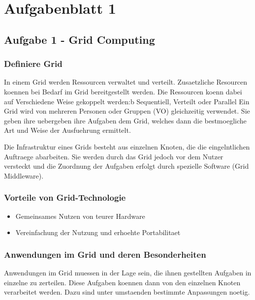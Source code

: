 \section{Aufgabenblatt 1}

\subsection{Aufgabe 1 - Grid Computing}

\subsubsection{Definiere Grid}
	In einem Grid werden Ressourcen verwaltet und verteilt.
	Zusaetzliche Resourcen koennen bei Bedarf im Grid bereitgestellt werden.
	Die Ressourcen koenn dabei auf Verschiedene Weise gekoppelt werden:b
	Sequentiell, Verteilt oder Parallel
	Ein Grid wird von mehreren Personen oder Gruppen (VO) gleichzeitig verwendet.
	Sie geben ihre uebergeben ihre Aufgaben dem Grid,
	welches dann die bestmoegliche Art und Weise der Ausfuehrung ermittelt.
	
	Die Infrastruktur eines Grids besteht aus einzelnen Knoten,
	die die eingelntlichen Auftraege abarbeiten.
	Sie werden durch das Grid jedoch vor dem Nutzer versteckt und die Zuordnung der
	Aufgaben erfolgt durch spezielle Software (Grid Middleware).
	
\subsubsection{Vorteile von Grid-Technologie}
	\begin{itemize}
	  \item Gemeinsames Nutzen von teurer Hardware
	  \item Vereinfachung der Nutzung und erhoehte Portabilitaet
	\end{itemize}
	
\subsubsection{Anwendungen im Grid und deren Besonderheiten}
	Anwendungen im Grid muessen in der Lage sein,
	die ihnen gestellten Aufgaben in einzelne zu zerteilen.
	Diese Aufgaben koennen dann von den einzelnen Knoten verarbeitet werden.
	Dazu sind unter umstaenden bestimmte Anpassungen noetig.
	
